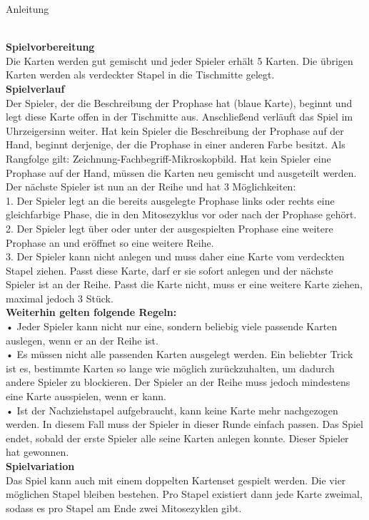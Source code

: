 \documentclass[fleqn,a4paper,12pt,titlepage,headsepline]{scrartcl}
\begin{document}
\begin{huge}
Anleitung
\end{huge}\\
	\textbf{Spielvorbereitung}\\
Die Karten werden gut gemischt und jeder Spieler erhält 5 Karten.
Die übrigen Karten werden als verdeckter Stapel in die
Tischmitte gelegt.\\
\textbf{Spielverlauf}\\
Der Spieler, der die Beschreibung der Prophase hat (blaue Karte), beginnt und legt
diese Karte offen in der Tischmitte aus. Anschließend
verläuft das Spiel im Uhrzeigersinn weiter. Hat kein
Spieler die Beschreibung der Prophase auf der Hand, beginnt derjenige,
der die Prophase in einer anderen Farbe besitzt. Als Rangfolge gilt: Zeichnung-Fachbegriff-Mikroskopbild. Hat kein Spieler eine Prophase
auf der Hand, müssen die Karten neu gemischt und
ausgeteilt werden.
Der nächste Spieler ist nun an der Reihe und hat 3
Möglichkeiten:\\
1. Der Spieler legt an die bereits ausgelegte Prophase
links oder rechts eine gleichfarbige Phase, die in den Mitosezyklus vor oder nach der Prophase gehört.\\ 
2. Der Spieler legt über oder unter der ausgespielten
Prophase eine weitere Prophase an und eröffnet so eine
weitere Reihe.\\
3. Der Spieler kann nicht anlegen und muss daher
eine Karte vom verdeckten Stapel ziehen. Passt
diese Karte, darf er sie sofort anlegen und der
nächste Spieler ist an der Reihe. Passt die Karte
nicht, muss er eine weitere Karte ziehen, maximal
jedoch 3 Stück.\\
\textbf{Weiterhin gelten folgende Regeln:}\\
• Jeder Spieler kann nicht nur eine, sondern beliebig
viele passende Karten auslegen, wenn er an der
Reihe ist.\\
• Es müssen nicht alle passenden Karten ausgelegt
werden. Ein beliebter Trick ist es, bestimmte Karten
so lange wie möglich zurückzuhalten, um dadurch
andere Spieler zu blockieren. Der Spieler an der Reihe muss jedoch mindestens eine Karte ausspielen,
wenn er kann.\\
• Ist der Nachziehstapel aufgebraucht, kann keine
Karte mehr nachgezogen werden. In diesem Fall
muss der Spieler in dieser Runde einfach passen.
Das Spiel endet, sobald der erste Spieler
alle seine Karten anlegen konnte. Dieser
Spieler hat gewonnen.\\
\textbf{Spielvariation}\\
Das Spiel kann auch mit einem doppelten Kartenset gespielt werden. Die vier möglichen Stapel bleiben bestehen. Pro Stapel existiert dann jede Karte zweimal, sodass es pro Stapel am Ende zwei Mitosezyklen gibt.
	
	
\end{document}
